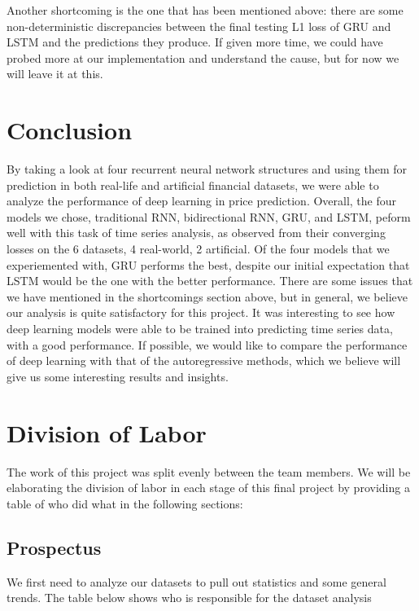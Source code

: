 \documentclass[letterpaper, 10 pt, conference]{ieeeconf}  %
\begin{document}
        Another shortcoming is the one that has been mentioned above: there are some non-deterministic discrepancies between the final testing L1 loss of GRU and LSTM and the predictions they produce. If given more time, we could have probed more at our implementation and understand the cause, but for now we will leave it at this.  
        

\section{Conclusion}
    By taking a look at four recurrent neural network structures and using them for prediction in both real-life and artificial financial datasets, we were able to analyze the performance of deep learning in price prediction. Overall, the four models we chose, traditional RNN, bidirectional RNN, GRU, and LSTM, peform well with this task of time series analysis, as observed from their converging losses on the 6 datasets, 4 real-world, 2 artificial. Of the four models that we experiemented with, GRU performs the best, despite our initial expectation that LSTM would be the one with the better performance. There are some issues that we have mentioned in the shortcomings section above, but in general, we believe our analysis is quite satisfactory for this project. It was interesting to see how deep learning models were able to be trained into predicting time series data, with a good performance. If possible, we would like to compare the performance of deep learning with that of the autoregressive methods, which we believe will give us some interesting results and insights.


\section{Division of Labor}
    The work of this project was split evenly between the team members. We will be elaborating the division of labor in each stage of this final project by providing a table of who did what in the following sections:

    \subsection{Prospectus}
        We first need to analyze our datasets to pull out statistics and some general trends. The table below shows who is responsible for the dataset analysis

    
\end{document}
